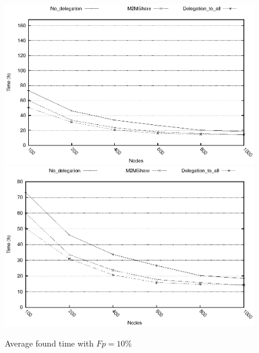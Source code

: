 \begin{figure}[htbp]
\centering%
\subfigure%
{\includegraphics{grafici/tempiVF_Fp10.eps}}\qquad\qquad
\subfigure%
{\includegraphics{grafici/tempiVF_Fp10_zoom.eps}}
\caption{Average found time with $Fp = 10\%$\label{graficiTempiVF_Fp10}}
\end{figure}

